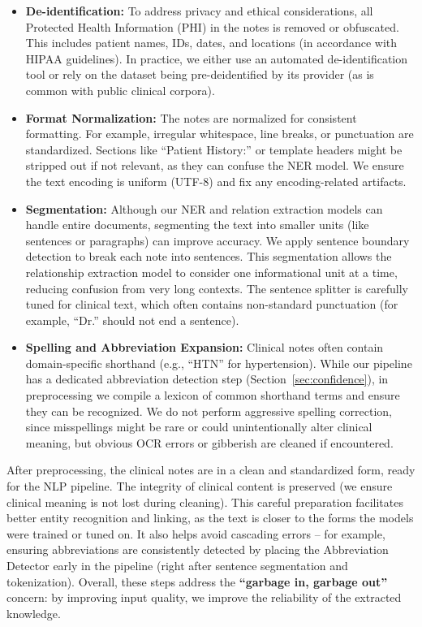 \begin{itemize}
\item \textbf{De-identification:} To address privacy and ethical considerations, all Protected Health Information (PHI) in the notes is removed or obfuscated. This includes patient names, IDs, dates, and locations (in accordance with HIPAA guidelines). In practice, we either use an automated de-identification tool or rely on the dataset being pre-deidentified by its provider (as is common with public clinical corpora).
\item \textbf{Format Normalization:} The notes are normalized for consistent formatting. For example, irregular whitespace, line breaks, or punctuation are standardized. Sections like ``Patient History:'' or template headers might be stripped out if not relevant, as they can confuse the NER model. We ensure the text encoding is uniform (UTF-8) and fix any encoding-related artifacts.
\item \textbf{Segmentation:} Although our NER and relation extraction models can handle entire documents, segmenting the text into smaller units (like sentences or paragraphs) can improve accuracy. We apply sentence boundary detection to break each note into sentences. This segmentation allows the relationship extraction model to consider one informational unit at a time, reducing confusion from very long contexts. The sentence splitter is carefully tuned for clinical text, which often contains non-standard punctuation (for example, ``Dr.'' should not end a sentence).
\item \textbf{Spelling and Abbreviation Expansion:} Clinical notes often contain domain-specific shorthand (e.g., ``HTN'' for hypertension). While our pipeline has a dedicated abbreviation detection step (Section~\ref{sec:confidence}), in preprocessing we compile a lexicon of common shorthand terms and ensure they can be recognized. We do not perform aggressive spelling correction, since misspellings might be rare or could unintentionally alter clinical meaning, but obvious OCR errors or gibberish are cleaned if encountered.
\end{itemize}

After preprocessing, the clinical notes are in a clean and standardized form, ready for the NLP pipeline. The integrity of clinical content is preserved (we ensure clinical meaning is not lost during cleaning). This careful preparation facilitates better entity recognition and linking, as the text is closer to the forms the models were trained or tuned on. It also helps avoid cascading errors – for example, ensuring abbreviations are consistently detected by placing the Abbreviation Detector early in the pipeline (right after sentence segmentation and tokenization). Overall, these steps address the \textbf{``garbage in, garbage out''} concern: by improving input quality, we improve the reliability of the extracted knowledge.

